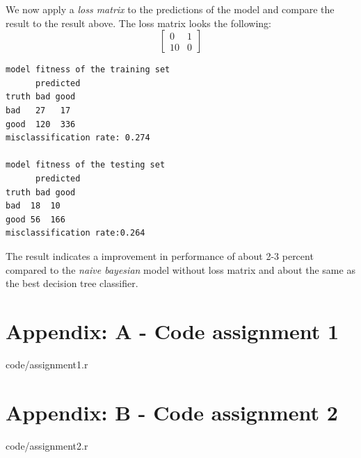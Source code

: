 \documentclass[a4paper,12pt]{article}
\begin{document}
We now apply a \textit{loss matrix} to the predictions of the model and compare the result to the result above. The loss matrix looks the following:
\begin{equation}
  \begin{bmatrix}
  0 & 1\\ 
  10 & 0
  \end{bmatrix}
\end{equation}

\begin{verbatim}
model fitness of the training set
      predicted
truth bad good
bad   27   17
good  120  336
misclassification rate: 0.274

model fitness of the testing set
      predicted
truth bad good
bad  18  10
good 56  166
misclassification rate:0.264
\end{verbatim}
The result indicates a improvement in performance of about 2-3 percent compared to the \textit{naive bayesian} model without loss matrix and about the same as the best decision tree classifier.

\section{Appendix: A - Code assignment 1}


    {code/assignment1.r}

\section{Appendix: B - Code assignment 2}


    {code/assignment2.r}
\end{document}
